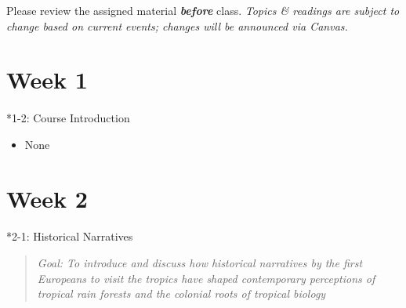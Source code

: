 \documentclass[
  10pt,
  letterpaper,
  oneside,
  open=any]{scrbook}
\makeatletter
\let\oldparagraph\paragraph
\renewcommand{\paragraph}{
    \@ifstar
      \xxxParagraphStar
      \xxxParagraphNoStar
  }
\newcommand{\xxxParagraphStar}[1]{\oldparagraph*{#1}\mbox{}}
\newcommand{\xxxParagraphNoStar}[1]{\oldparagraph{#1}\mbox{}}
\providecommand{\tightlist}{%
  \setlength{\itemsep}{0pt}\setlength{\parskip}{0pt}}
\makeatother
\begin{document}
\begin{tcolorbox}[enhanced jigsaw, colframe=quarto-callout-important-color-frame, colbacktitle=quarto-callout-important-color!10!white, title=\textcolor{quarto-callout-important-color}{\faExclamation}\hspace{0.5em}{Important}, breakable, coltitle=black, titlerule=0mm, leftrule=.75mm, left=2mm, opacitybacktitle=0.6, toprule=.15mm, opacityback=0, bottomtitle=1mm, toptitle=1mm, arc=.35mm, colback=white, rightrule=.15mm, bottomrule=.15mm]

Please review the assigned material \textbf{\emph{before}} class.
\emph{Topics \& readings are subject to change based on current events;
changes will be announced via Canvas.}

\end{tcolorbox}

\section*{Week 1}\label{week-1}


\paragraph*{1-2: Course Introduction}\label{course-introduction}

\begin{itemize}
\tightlist
\item
  None
\end{itemize}

\section*{Week 2}\label{week-2}


\paragraph*{2-1: Historical Narratives}\label{historical-narratives}

\begin{quote}
\emph{Goal: To introduce and discuss how historical narratives by the
first Europeans to visit the tropics have shaped contemporary
perceptions of tropical rain forests and the colonial roots of tropical
biology}
\end{quote}
\end{document}
